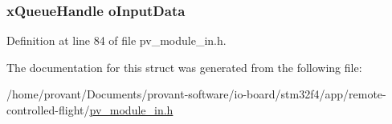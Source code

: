 \subsubsection[{\texorpdfstring{o\+Input\+Data}{oInputData}}]{\setlength{\rightskip}{0pt plus 5cm}x\+Queue\+Handle o\+Input\+Data}\hypertarget{structpv__interface__in_a1b28b7bd6ca96936bf91240eea51d3b9}{}\label{structpv__interface__in_a1b28b7bd6ca96936bf91240eea51d3b9}


Definition at line 84 of file pv\+\_\+module\+\_\+in.\+h.



The documentation for this struct was generated from the following file\+:\begin{DoxyCompactItemize}
\item 
/home/provant/\+Documents/provant-\/software/io-\/board/stm32f4/app/remote-\/controlled-\/flight/\hyperlink{pv__module__in_8h}{pv\+\_\+module\+\_\+in.\+h}\end{DoxyCompactItemize}

